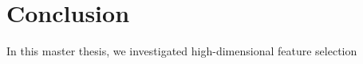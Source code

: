 \cleardoublepage
\chapter*{Conclusion}

In this master thesis,
we investigated high-dimensional feature selection